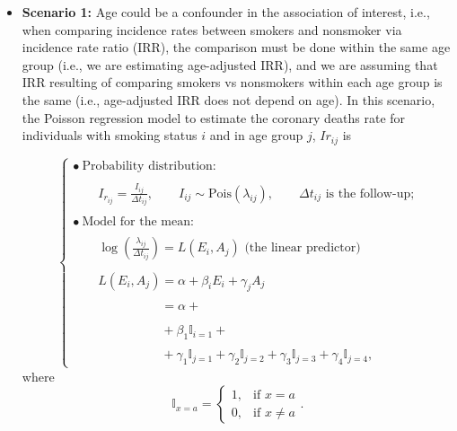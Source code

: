 \documentclass[a4paper,10pt]{article}\usepackage[]{graphicx}\usepackage[]{xcolor}
\newcommand{\I}{\mathbb{I}}   %
\begin{document}
\begin{itemize}
  \item \textbf{Scenario 1:} Age could be a confounder in the association of interest, i.e., when comparing incidence rates between smokers and nonsmoker via incidence rate ratio (IRR), the comparison must be done within the same age group (i.e., we are estimating age-adjusted IRR), and we are assuming that IRR resulting of comparing smokers vs nonsmokers within each age group is the same (i.e., age-adjusted IRR does not depend on age). In this scenario, the Poisson regression model to estimate the coronary deaths rate for individuals with smoking status $i$ and in age group $j$, $Ir_{ij}$ is
  
  
\begin{equation}
\label{eq:modelmain}
\left\{
\begin{array}{l}
\bullet\ \text{Probability distribution:} \\ \\
\qquad
I_{r_{ij}}
=
\frac{I_{ij}}{\Delta t_{ij}},
\qquad
I_{ij} \sim  \text{Pois}(\lambda_{ij}),
\qquad
\Delta t_{ij}\text{ is the follow-up;}\\ \\
\bullet\ \text{Model for the mean:} \\ \\
\qquad
\log
\left(
\frac{\lambda_{ij}}{\Delta t_{ij}}
\right)
=
L(E_i, A_j) \text{ (the linear predictor)}\\ \\
\qquad
L(E_i, A_j)
 = 
\alpha + \beta_i E_i + \gamma_j A_j\\
\phantom{
\qquad
L(E_i, A_j)
}
 = 
\alpha + \\
\phantom{
\qquad
L(E_i, A_j)
} + \beta_1 \I_{i=1} + \\
\phantom{
\qquad
L(E_i, A_j)
} + 
\gamma_1 \I_{j=1} +
\gamma_2 \I_{j=2} +
\gamma_3 \I_{j=3} +
\gamma_4 \I_{j=4},
\end{array}
\right.
\end{equation}
where
\begin{equation*}
\I_{x=a}
=
\left\{
\begin{array}{ll}
1, & \text{if } x = a \\
0, & \text{if } x \neq a
\end{array}
\right..
\end{equation*}


\end{itemize}
\end{document}
